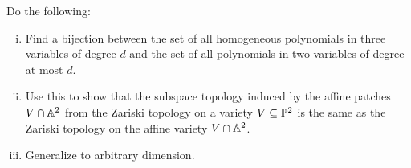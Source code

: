 \documentclass[12pt]{memoir}
\begin{document}
  \begin{Ej}
    Do the following:
    \begin{enumerate}[i)]
      \itemsep=-0.4em 
      \item Find a bijection between the set of all homogeneous polynomials in three variables of degree $d$ and the set of all polynomials in two variables of degree at most $d$. 
      \item Use this to show that the subspace topology induced by the affine patches $V\cap\mathbb{A}^2$ from the Zariski topology on a variety $V\subseteq\mathbb{P}^2$ is the same as the Zariski topology on the affine variety $V\cap\mathbb{A}^2$.
      \item Generalize to arbitrary dimension. 
    \end{enumerate}
  \end{Ej}
\end{document}
